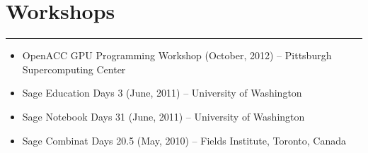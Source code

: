 \documentclass[letterpaper,10pt]{article}
\newcommand{\mblue}{\color{darkblue}}
\begin{document}
\section*{\mblue Workshops}

\vspace{-2.15pc}
{\hfill\mblue\rule{5.76in}{0.02cm}}

\vspace{1pc}
\begin{itemize}
\item OpenACC GPU Programming Workshop (October, 2012) -- Pittsburgh Supercomputing Center
\item Sage Education Days 3 (June, 2011) -- University of Washington
\item Sage Notebook Days 31 (June, 2011) -- University of Washington
\item Sage Combinat Days 20.5 (May, 2010) -- Fields Institute, Toronto, Canada
\end{itemize}
\end{document}
